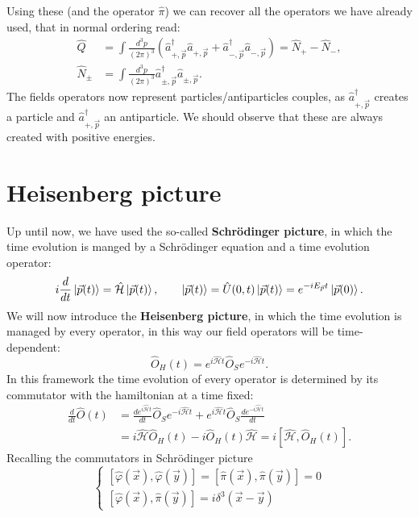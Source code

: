 Using these (and the operator $\hat\pi$) we can recover all the operators we have already used, that in normal ordering read:
\begin{align*}
    \hat Q&=\int\frac{d^3p}{(2\pi)^3}(\hat{a}^\dagger_{+,\vec p}\hat{a}_{+,\vec p}+\hat{a}^\dagger_{-,\vec p}\hat{a}_{-,\vec p})=\hat N_+-\hat N_-,\\
    \hat N_{\pm}&=\int\frac{d^3p}{(2\pi)^3}\hat{a}^\dagger_{\pm,\vec p}\hat{a}_{\pm,\vec p}.
\end{align*}
The fields operators now represent particles/antiparticles couples, as $\hat{a}^\dagger_{+,\vec p}$ creates a particle and $\hat{a}^\dagger_{+,\vec p}$ an antiparticle. We should observe that these are always created with positive energies.
\section{Heisenberg picture}
Up until now, we have used the so-called \textbf{Schrödinger picture}, in which the time evolution is manged by a Schrödinger equation and a time evolution operator:
\begin{equation*}
    i\frac{d}{dt}\ket{\vec{p}(t)}=\hat{\mathcal{H} }\ket{\vec p(t)},\qquad \ket{\vec p(t)}=\hat{U}(0,t)\ket{\vec p(t)}=e^{-iE_{\vec{ p}}t}\ket{\vec p(0)}.
\end{equation*}
We will now introduce the \textbf{Heisenberg picture}, in which the time evolution is managed by every operator, in this way our field operators will be time-dependent:
\begin{equation*}
    \hat{O}_H(t)=e^{i\hat{\mathcal{H}} t}\hat{O}_Se^{-i\hat{\mathcal{H}} t}.
\end{equation*}
In this framework the time evolution of every operator is determined by its commutator with the hamiltonian at a time fixed:
\begin{align*}
    \frac{d}{dt}\hat{O}(t)&=\frac{de^{i\hat{\mathcal{H}} t}}{dt}\hat{O}_Se^{-i\hat{\mathcal{H}} t}+e^{i\hat{\mathcal{H}} t}\hat{O}_S\frac{de^{-i\hat{\mathcal{H}} t}}{dt}\\&=i\hat{\mathcal{H} }\hat{O}_H(t)-i\hat{O}_H(t)\hat{\mathcal{H} }=i[\hat{\mathcal{H} },\hat{O}_H(t)].
\end{align*}
Recalling the commutators in Schrödinger picture
\begin{equation*}
    \begin{cases}
        [\hat{\varphi}(\vec x),\hat{\varphi}(\vec y)]=[\hat{\pi}(\vec x), \hat{\pi}(\vec y)]=0\\
        [\hat{\varphi}(\vec x), \hat{\pi}(\vec y)]=i\delta^3(\vec x-\vec y)
    \end{cases}
\end{equation*}

